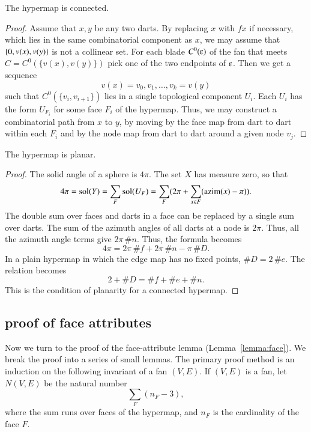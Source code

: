 {\begin{corollary}  
The hypermap is connected.
\end{corollary}

\begin{proof} Assume that $x,y$ be any two darts.  By replacing $x$ with $f x$ if necessary, which lies in the same combinatorial component as $x$, we may
assume that $\{0,v(x),v(y)\}$ is not a collinear set. 
For each blade $C^0(\e)$ of the fan that meets $C=C^0(\{v(x),v(y)\})$
pick one of the two endpoints of $\e$.  Then we get a sequence
$$
v(x)=v_0,v_1,\ldots,v_k=v(y)
$$
such that $C^0(\{v_i,v_{i+1}\})$ lies in a single topological component $U_i$.  Each $U_i$ has the form $U_{F_i}$ for some face $F_i$ of the hypermap.
Thus, we may construct a combinatorial path from $x$ to $y$, by moving by the face map from dart to dart within each $F_i$ and by the node map from dart to dart around a given node $v_j$.
\end{proof}

\begin{corollary}  
The hypermap is planar.
\end{corollary}

\begin{proof}  The solid angle of a sphere is $4\pi$.  The set $X$
has measure zero, so that
$$
4\pi = \operatorname{sol}(Y)= \sum_F \operatorname{sol}(U_F) = 
\sum_F ( 2\pi + \sum_{x\in F} ({\operatorname{azim}}(x)-\pi) ).
$$
The double sum over faces and darts in a face can be replaced by
a single sum over darts.  
The sum of the azimuth angles of all darts at a node is $2\pi$. Thus,
all the azimuth angle terms give $2\pi\,\#n$.
Thus, the formula becomes
$$
4\pi = 2\pi\, \#f +2\pi\,\#n - \pi\, \#D.
$$
In a plain hypermap in which the edge map has no fixed points, $\#D = 2\,\#e$.
The relation becomes
$$
2 + \#D = \#f + \#e + \#n.
$$
This is the condition of planarity for a connected hypermap.
\end{proof}

\subsection{proof of face attributes}

Now we turn to the proof of the face-attribute lemma (Lemma~\ref{lemma:face}).  We break the proof into a series of small lemmas.  The primary proof method is an induction on the following invariant of a fan $(V,E)$.  If $(V,E)$ is a fan,  let $N(V,E)$ be the natural number
$$
\sum_F (n_F - 3),
$$
where the sum runs over faces of the  hypermap, and $n_F$ is the cardinality of the face $F$.

}
